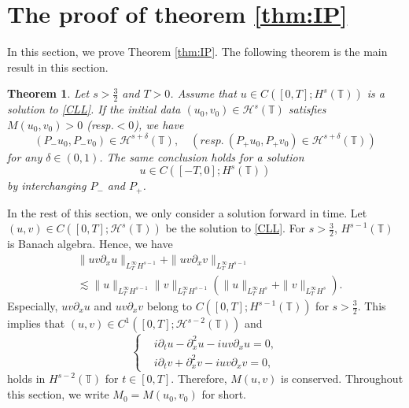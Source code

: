 \documentclass[%
11pt,  reqno]{amsart}
\newtheorem{theorem}{Theorem} [section]
\newcommand{\T}{\mathbb{T}}
\renewcommand{\H}{\mathcal H}
\newcommand{\dl}{\delta}
\newcommand{\dx}{\partial_x}
\newcommand{\dt}{\partial_t}
\newcommand{\les}{\lesssim}
\newcommand{\ges}{\gtrsim}
\numberwithin{equation}{section}
\numberwithin{theorem}{section}
\begin{document}



\section{The proof of theorem \ref{thm:IP}}
\label{SEC:IP}
In this section, we prove Theorem \ref{thm:IP}.
The following theorem is the main result in this section.

\begin{theorem}
\label{thm:NE}
Let $s> \frac 32$ and $T>0$.
Assume that
$u \in C([0,T]; H^s(\T))$ is a solution to \eqref{CLL}.
If the initial data $(u_0, v_0) \in \H^s(\T)$ satisfies 
$M(u_0, v_0) > 0$ (resp.\:$< 0$),
we have
\[
(P_- u_0, P_- v_0) \in \H^{s+\dl}(\T), \quad (resp.\: (P_+ u_0, P_+ v_0) \in \H^{s+\dl}(\T))
\]
for any  $\dl \in (0, 1)$.
The same conclusion holds for 
a solution 
\[
u \in C([-T,0]; H^s(\T))
\] by interchanging $P_-$ and $P_+$.
\end{theorem}
In the rest of this section, 
we only consider a solution forward in time.
Let $(u, v) \in C([0,T]; \H^s(\T))$ be the solution to \eqref{CLL}.
For $s > \frac 32$, $H^{s-1}(\T)$ is Banach algebra.
Hence, we have
\[
\begin{aligned}
&\| u v \dx u \|_{L_T^\infty H^{s-1}} + \| u v \dx v \|_{L_T^\infty H^{s-1}} 
\\
&\les \|u\|_{L_T^\infty H^{s-1}} \|v\|_{L_T^\infty H^{s-1}}
(\|u\|_{L_T^\infty H^s} + \|v\|_{L_T^\infty H^s} ). 
\end{aligned}
\]
Especially, $u v \dx u$ and $u v \dx v$ belong to $C([0,T];H^{s-1}(\T))$ for $s > \frac 32$.
This implies that $(u, v) \in C^1([0,T]; \H^{s-2}(\T))$ 
and
\begin{equation*}
\left\{
\begin{aligned}
&i \dt u - \dx^2 u - i u v \dx u = 0,
\\
&i \dt v + \dx^2 v - i u v \dx v = 0,
\end{aligned}
\right.
\end{equation*}
holds in $H^{s-2}(\T)$ for $t \in [0, T]$. 
Therefore, $M(u,v)$ is conserved.
Throughout this section,
we write $M_0 = M(u_0, v_0)$ for short.
 
\end{document}
